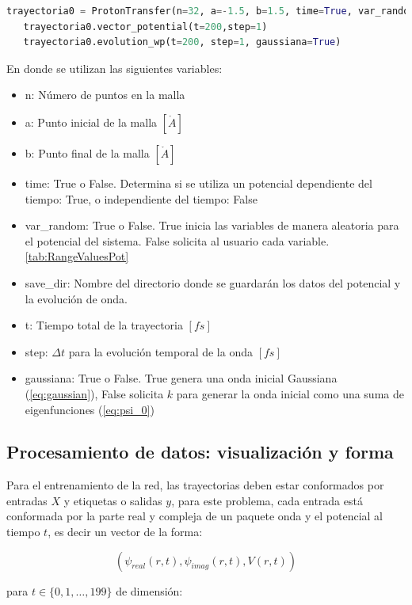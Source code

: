  \begin{lstlisting}[language=Python, morekeywords={ProtonTransfer, True, False}]
   trayectoria0 = ProtonTransfer(n=32, a=-1.5, b=1.5, time=True, var_random=True, save_dir='data0')
   trayectoria0.vector_potential(t=200,step=1)
   trayectoria0.evolution_wp(t=200, step=1, gaussiana=True)\end{lstlisting}

En donde se utilizan las siguientes variables:
\begin{itemize}[label=\textcolor{CTtitle}{\textbullet}]
\item n: Número de puntos en la malla
\item a: Punto inicial de la malla $[\mathring{A}]$
\item b: Punto final de la malla $[\mathring{A}]$
\item time: True o False. Determina si se utiliza un potencial dependiente del tiempo: True, o independiente del tiempo: False  
\item var\_random: True o False. True inicia las variables de manera aleatoria para el potencial del sistema. False solicita al usuario cada variable. \autoref{tab:RangeValuesPot}
\item save\_dir: Nombre del directorio donde se guardarán los datos del potencial y la evolución de onda.
\item t: Tiempo total de la trayectoria $[fs]$
\item step: $\Delta t$ para la evolución temporal de la onda $[fs]$
\item gaussiana: True o False. True genera una onda inicial Gaussiana (\autoref{eq:gaussian}), False solicita $k$ para generar la onda inicial como una suma de eigenfunciones (\autoref{eq:psi_0}) 
\end{itemize}

\subsection{Procesamiento de datos: visualización y forma}\label{sec:6.4.2}

Para el entrenamiento de la red, las trayectorias deben estar conformados por entradas $X$ y etiquetas o salidas $y$, para este problema, cada entrada está conformada por la parte real y compleja de un paquete onda y el potencial al tiempo $t$, es decir un vector de la forma:

$$(\psi_{real}(r,t), \psi_{imag}(r,t),V(r,t))$$

para $t \in \{0,1,\dots,199\}$ de dimensión:

